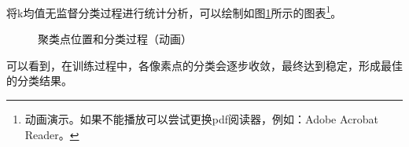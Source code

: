 将k均值无监督分类过程进行统计分析，可以绘制如图\ref{fig:airport_44_animate}所示的图表\footnote{动画演示。如果不能播放可以尝试更换pdf阅读器，例如：Adobe Acrobat Reader。}。
\begin{figure}[H]
	\centering
	\caption{聚类点位置和分类过程（动画）}
	\label{fig:airport_44_animate}
\end{figure}
可以看到，在训练过程中，各像素点的分类会逐步收敛，最终达到稳定，形成最佳的分类结果。